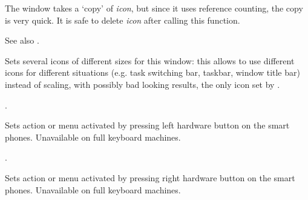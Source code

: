 
The window takes a `copy' of {\it icon}, but since it uses reference
counting, the copy is very quick. It is safe to delete {\it icon} after
calling this function.

See also .


\label{wxtoplevelwindowseticons}


Sets several icons of different sizes for this window: this allows to use
different icons for different situations (e.g. task switching bar, taskbar,
window title bar) instead of scaling, with possibly bad looking results, the
only icon set by .




.


\label{wxtoplevelwindowsetleftmenu}


Sets action or menu activated by pressing left hardware button on the smart phones.
Unavailable on full keyboard machines.






.


\label{wxtoplevelwindowsetrightmenu}


Sets action or menu activated by pressing right hardware button on the smart phones.
Unavailable on full keyboard machines.

